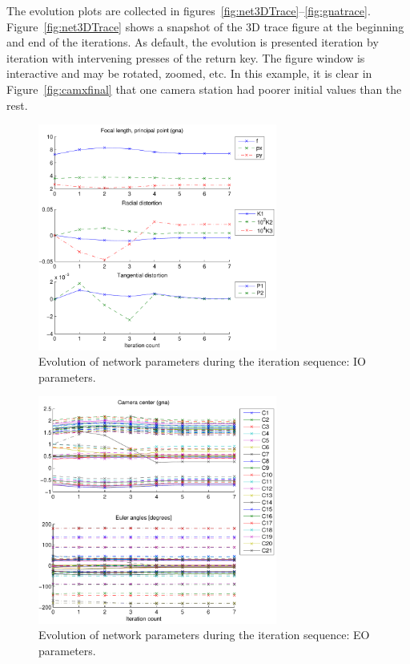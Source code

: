\documentclass{article}
\begin{document}
The evolution plots are collected in
figures~\ref{fig:net3DTrace}--\ref{fig:gnatrace}.
Figure~\ref{fig:net3DTrace} shows a snapshot of the 3D trace figure at
the beginning and end of the iterations. As default, the evolution is
presented iteration by iteration with intervening presses of the
return key. The figure window is interactive and may be rotated,
zoomed, etc. In this example, it is clear in
Figure~\ref{fig:camxfinal} that one camera station had poorer initial
values than the rest.

\begin{figure}
  \centering
  \includegraphics[width=0.7\textwidth]{ill/ccamiotrace}
  \caption{Evolution of network parameters during the iteration
    sequence: IO parameters.}
  \label{fig:IOtrace}
\end{figure}

\begin{figure}
  \centering
  \includegraphics[width=0.7\textwidth]{ill/ccameotrace}
  \caption{Evolution of network parameters during the iteration
    sequence: EO parameters.}
  \label{fig:EOtrace}
\end{figure}
\end{document}
